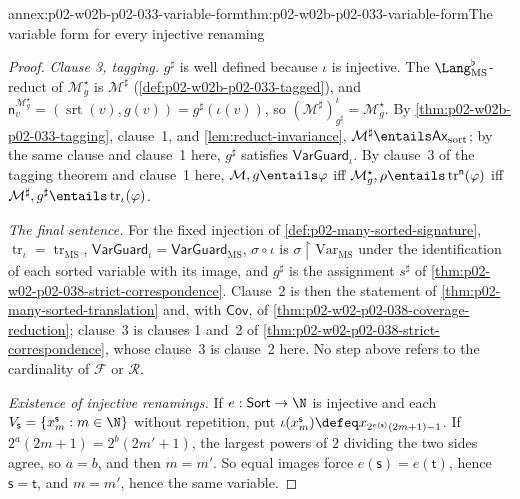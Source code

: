 \begin{annexitem}{annex:p02-w02b-p02-033-variable-form}{thm:p02-w02b-p02-033-variable-form}{The variable form for every injective renaming}
\begin{proof}
\emph{Clause 3, tagging.}  \(g^{\sharp}\) is well defined because \(\iota\) is
injective.  The \(\Lang_{\mathrm{MS}}^{\flat}\)-reduct of
\(\mathcal M^{\star}_{g}\) is \(\mathcal M^{\sharp}\)
(\cref{def:p02-w02b-p02-033-tagged}), and
\(\mathsf n_v^{\mathcal M^{\star}_{g}}=(\operatorname{srt}(v),g(v))=
g^{\sharp}(\iota(v))\), so \((\mathcal M^{\sharp})^{\iota}_{g^{\sharp}}=
\mathcal M^{\star}_{g}\).  By \cref{thm:p02-w02b-p02-033-tagging}, clause~1,
and \cref{lem:reduct-invariance}, \(\mathcal M^{\sharp}\entails
\mathsf{Ax}_{\mathrm{sort}}\); by the same clause and clause~1 here,
\(g^{\sharp}\) satisfies \(\mathsf{VarGuard}_{\iota}\).  By clause~3 of the
tagging theorem and clause~1 here, \(\mathcal M,g\entails\varphi\) iff
\(\mathcal M^{\star}_{g},\rho\entails\operatorname{tr}^{\mathsf n}(\varphi)\)
iff \(\mathcal M^{\sharp},g^{\sharp}\entails\operatorname{tr}_{\iota}(\varphi)\).

\emph{The final sentence.}  For the fixed injection of
\cref{def:p02-many-sorted-signature}, \(\operatorname{tr}_{\iota}=
\operatorname{tr}_{\mathrm{MS}}\), \(\mathsf{VarGuard}_{\iota}=
\mathsf{VarGuard}_{\mathrm{MS}}\), \(\sigma\circ\iota\) is
\(\sigma{\restriction}\mathrm{Var}_{\mathrm{MS}}\) under the identification of
each sorted variable with its image, and \(g^{\sharp}\) is the assignment
\(s^{\sharp}\) of \cref{thm:p02-w02-p02-038-strict-correspondence}.  Clause~2
is then the statement of \cref{thm:p02-many-sorted-translation} and, with
\(\mathsf{Cov}\), of \cref{thm:p02-w02-p02-038-coverage-reduction}; clause~3
is clauses 1 and~2 of \cref{thm:p02-w02-p02-038-strict-correspondence}, whose
clause~3 is clause~2 here.  No step above refers to the cardinality of
\(\mathcal F\) or \(\mathcal R\).

\emph{Existence of injective renamings.}  If \(e:\mathsf{Sort}\to\N\) is
injective and each \(V_{\mathsf s}=\{x^{\mathsf s}_m:m\in\N\}\) without
repetition, put \(\iota(x^{\mathsf s}_m)\defeq x_{2^{e(\mathsf s)}(2m+1)-1}\).
If \(2^{a}(2m+1)=2^{b}(2m'+1)\), the largest powers of \(2\) dividing the two
sides agree, so \(a=b\), and then \(m=m'\).  So equal images force
\(e(\mathsf s)=e(\mathsf t)\), hence \(\mathsf s=\mathsf t\), and \(m=m'\),
hence the same variable.
\end{proof}
\end{annexitem}

